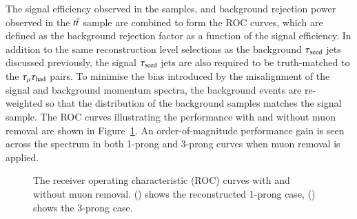         The signal efficiency observed in the \GHHFourtau samples, and background rejection power observed in the $t\bar{t}$ sample 
        are combined to form the ROC curves, which are defined as the background rejection factor as a function of the signal efficiency. 
        In addition to the same reconstruction level selections as the background $\tau_\mathrm{seed}$ jets discussed previously, the 
        signal $\tau_\mathrm{seed}$ jets are also required to be truth-matched to the $\tau_\mathrm{\mu}\tau_\mathrm{had}$ pairs. To minimise the 
        bias introduced by the misalignment of the signal and background momentum spectra, the background events
        are re-weighted so that the \pt distribution of the background samples matches the signal sample. 
        The ROC curves illustrating the performance with and without muon removal are shown in Figure~\ref{fig:murm:roc}. 
        An order-of-magnitude performance gain is seen across the spectrum in both 1-prong and 3-prong curves
        when muon removal is applied.

        \begin{figure}[hbtp]
            \begin{center}
                \caption{The receiver operating characteristic (ROC) curves with and without muon removal. 
                (\protect{}) shows the reconstructed 1-prong case, 
                (\protect{}) shows the 3-prong case.}
                \label{fig:murm:roc}
            \end{center}
        \end{figure}


